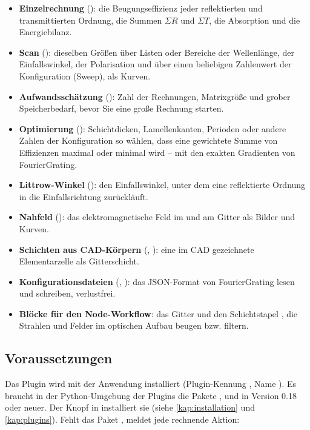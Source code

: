 \begin{itemize}
  \item \textbf{Einzelrechnung} (): die Beugungseffizienz jeder reflektierten und
    transmittierten Ordnung, die Summen $\Sigma R$ und $\Sigma T$, die Absorption und die
    Energiebilanz.
  \item \textbf{Scan} (): dieselben Größen über Listen oder Bereiche der Wellenlänge,
    der Einfallswinkel, der Polarisation und über einen beliebigen Zahlenwert der Konfiguration
    (Sweep), als Kurven.
  \item \textbf{Aufwandsschätzung} (): Zahl der Rechnungen, Matrixgröße und grober
    Speicherbedarf, bevor Sie eine große Rechnung starten.
  \item \textbf{Optimierung} (): Schichtdicken, Lamellenkanten, Perioden oder andere
    Zahlen der Konfiguration so wählen, dass eine gewichtete Summe von Effizienzen maximal oder
    minimal wird -- mit den exakten Gradienten von FourierGrating.
  \item \textbf{Littrow-Winkel} (): den Einfallswinkel, unter dem eine
    reflektierte Ordnung in die Einfallsrichtung zurückläuft.
  \item \textbf{Nahfeld} (): das elektromagnetische Feld im und am Gitter als
    Bilder und Kurven.
  \item \textbf{Schichten aus CAD-Körpern} (, ):
    eine im CAD gezeichnete Elementarzelle als Gitterschicht.
  \item \textbf{Konfigurationsdateien} (, ): das
    JSON-Format von FourierGrating lesen und schreiben, verlustfrei.
  \item \textbf{Blöcke für den Node-Workflow}: das Gitter  und den Schichtstapel
    , die Strahlen und Felder im optischen Aufbau beugen bzw. filtern.
\end{itemize}

\subsection{Voraussetzungen}\label{sec:fg-voraussetzungen}

Das Plugin wird mit der Anwendung installiert (Plugin-Kennung , Name
). Es braucht in der Python-Umgebung der Plugins die Pakete
,  und  in Version 0.18 oder neuer. Der Knopf
 in  installiert sie (siehe
\autoref{kap:installation} und \autoref{kap:plugins}). Fehlt das Paket , meldet
jede rechnende Aktion:


